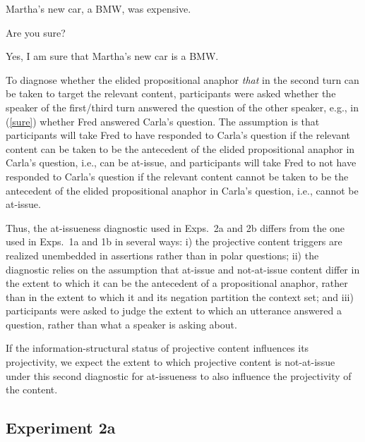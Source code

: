 \documentclass[11pt,fleqn]{article}
\newcommand{\6}{\mbox{$[\hspace*{-.6mm}[$}}
\newcommand{\9}{\mbox{$]\hspace*{-.6mm}]$}}
\begin{document}
\begin{exe}
\ex\label{sure} 
\begin{xlist}
 Martha’s new car, a BMW, was expensive.

 Are you sure?

 Yes, I am sure that Martha's new car is a BMW.
\end{xlist}

%
%
%
\end{exe}
To diagnose whether the elided propositional anaphor {\em that} in the second turn can be taken to target the relevant content, participants were asked whether the speaker of the first/third turn answered the question of the other speaker, e.g., in (\ref{sure}) whether Fred answered Carla's question. The assumption is that participants will take Fred to have responded to Carla's question if the relevant content can be taken to be the antecedent of the elided propositional anaphor in Carla's question, i.e., can be at-issue, and participants will take Fred to not have responded to Carla's question if the relevant content cannot be taken to be the antecedent of the elided propositional anaphor in  Carla's question, i.e., cannot be at-issue.

Thus, the at-issueness diagnostic used in Exps.~2a and 2b differs from the one used in Exps.~1a and 1b in several ways: i) the projective content triggers are realized unembedded in assertions rather than in polar questions; ii) the diagnostic relies on the assumption that at-issue and not-at-issue content differ in the extent to which it can be the antecedent of a propositional anaphor, rather than in the extent to which it and its negation partition the context set; and iii) participants were asked to judge the extent to which an utterance answered a question, rather than what a speaker is asking about.

If the information-structural status of projective content influences its projectivity, we expect the extent to which projective content is not-at-issue under this second diagnostic for at-issueness to also influence the projectivity of the content.

\subsection{Experiment 2a}
\end{document}
